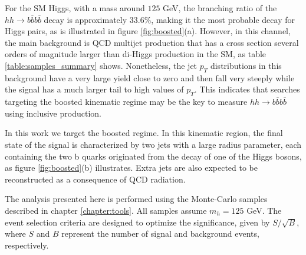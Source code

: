 %


For the SM Higgs, with a mass around $125$ GeV, the branching ratio of the $hh\rightarrow b\overline{b}b\overline{b}$ decay is approximately $33.6\%$, making it the most probable decay for Higgs pairs, as is illustrated in figure \ref{fig:boosted}(a).
However, in this channel, the main background is QCD multijet production that has a cross section several orders of magnitude larger than di-Higgs production in the SM, as table \ref{table:samples_summary} shows. Nonetheless, the jet $p_T$ distributions in this background have a very large yield close to zero and then fall very steeply while the signal has a much larger tail to high values of $p_T$. This indicates that searches targeting the boosted kinematic regime may be the key to measure $hh\rightarrow b\overline{b}b\overline{b}$ using inclusive production.

In this work we target the boosted regime. In this kinematic region, the final state of the signal is characterized by two jets with a large radius parameter, each containing the two b quarks originated from the decay of one of the Higgs bosons, as figure \ref{fig:boosted}(b) illustrates. Extra jets are also expected to be reconstructed as a consequence of QCD radiation. 

The analysis presented here is performed using the Monte-Carlo samples described in chapter \ref{chapter:tools}. All samples assume $m_h=125$ GeV. The event selection criteria are designed to optimize the significance, given by $S/\sqrt{B}$, where $S$ and $B$ represent the number of signal and background events, respectively. 

